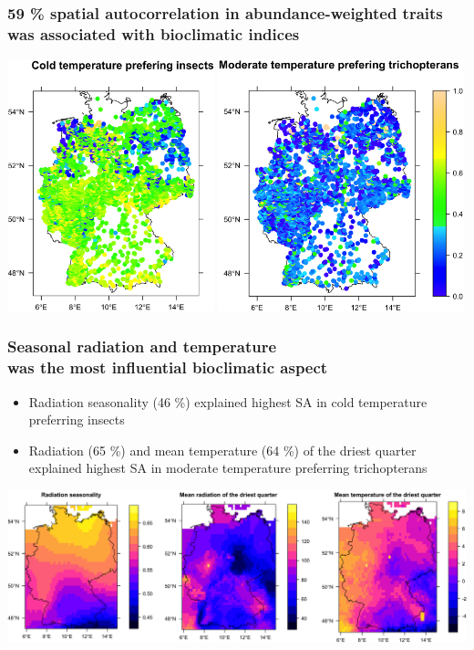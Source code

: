 \documentclass[10pt, compress]{beamer}
\begin{document}
\begin{frame}[fragile]
  \frametitle{59 \% spatial autocorrelation in abundance-weighted traits\protect\\was associated with bioclimatic indices}
  \centering
  \includegraphics[width=0.45\textwidth]{images/Cold.png}
  \pause
  \hspace{2pt}
  \includegraphics[width=0.535\textwidth]{images/Modetri.png}
  
\end{frame}

\begin{frame}[fragile]
\frametitle{Seasonal radiation and temperature\protect\\was the most influential bioclimatic aspect}
\begin{itemize}
\item \alert{Radiation seasonality (46 \%)} explained highest SA in cold temperature preferring insects
\pause
\item \alert{Radiation (65 \%) and mean temperature (64 \%) of the driest quarter} explained highest SA in moderate temperature preferring trichopterans
\end{itemize}
\pause
\centering
\includegraphics[width=1\textwidth]{images/Inf_Bio.png}
\end{frame}
\end{document}

